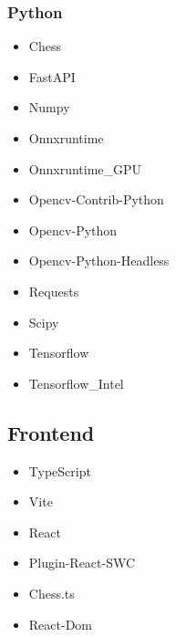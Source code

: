 \subsubsection*{Python}


\begin{itemize}
    \item Chess
    \item FastAPI
    \item Numpy
    \item Onnxruntime
    \item Onnxruntime\_GPU
    \item Opencv-Contrib-Python
    \item Opencv-Python
    \item Opencv-Python-Headless
    \item Requests
    \item Scipy
    \item Tensorflow
    \item Tensorflow\_Intel
\end{itemize}

\subsection{Frontend}

\begin{itemize}
    \item TypeScript
    \item Vite
    \item React
    \item Plugin-React-SWC
    \item Chess.ts
    \item React-Dom
\end{itemize}



